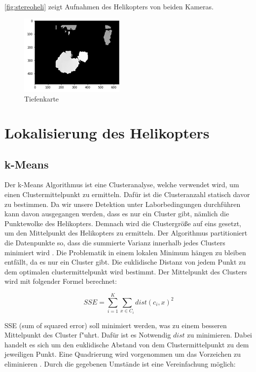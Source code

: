 \noindent \ref{fig:stereoheli} zeigt Aufnahmen des Helikopters von beiden Kameras.

\begin{figure}[H]
	\includegraphics[scale=2.0]{bilder/Tiefenkarte}
	\caption[Tiefenkarte]{Tiefenkarte}
	\label{fig:tiefenkarte}%
\end{figure}

\section{Lokalisierung des Helikopters} 
\label{sec:lokalisierung}

\subsection{k-Means}
\label{subsec:kmeans}

Der k-Means Algorithmus ist eine Clusteranalyse, welche verwendet wird, um einen Clustermittelpunkt zu ermitteln. Dafür ist die Clusteranzahl statisch davor zu bestimmen. Da wir unsere Detektion unter Laborbedingungen durchführen kann davon ausgegangen werden, dass es nur ein Cluster gibt, nämlich die Punktewolke des Helikopters. Demnach wird die Clustergröße auf eins gesetzt, um den Mittelpunkt des Helikopters zu ermitteln. {Der Algorithmus partitioniert die Datenpunkte so, dass die summierte Varianz innerhalb jedes Clusters minimiert wird} \cite{KM}.\newline
\noindent Die Problematik in einem lokalen Minimum hängen zu bleiben entfällt, da es nur ein Cluster gibt. Die euklidische Distanz von jedem Punkt zu dem optimalen clustermittelpunkt wird bestimmt. Der Mittelpunkt des Clusters wird mit folgender Formel berechnet:

\begin{equation}
SSE=\sum_{i=1}^K \sum_{x \in C_i} dist(c_i, x)^{2}
\end{equation}

\noindent SSE (sum of squared error) soll minimiert werden, was zu einem besseren Mittelpunkt des Cluster f"uhrt. Dafür ist es Notwendig $dist$ zu minimieren. Dabei
handelt es sich um den euklidische Abstand von dem Clustermittelpunkt zu dem jeweiligen Punkt. Eine Quadrierung wird vorgenommen um das Vorzeichen zu eliminieren \cite{TUM}. Durch die gegebenen Umstände ist eine Vereinfachung möglich:\newline

